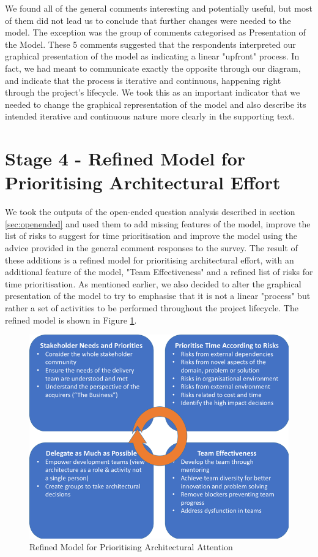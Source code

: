 We found all of the general comments interesting and potentially useful, but most of them did not lead us to conclude that further changes were needed to the model.  The exception was the group of comments categorised as Presentation of the Model.  These 5 comments suggested that the respondents interpreted our graphical presentation of the model as indicating a linear "upfront" process.  In fact, we had meant to communicate exactly the opposite through our diagram, and indicate that the process is iterative and continuous, happening right through the project's lifecycle.  We took this as an important indicator that we needed to change the graphical representation of the model and also describe its intended iterative and continuous nature more clearly in the supporting text.

\section{Stage 4 - Refined Model for Prioritising Architectural Effort}
\label{sec:refined-model}

We took the outputs of the open-ended question analysis described in section \ref{sec:openended} and used them to add missing features of the model, improve the list of risks to suggest for time prioritisation and improve the model using the advice provided in the general comment responses to the survey.
The result of these additions is a refined model for prioritising architectural effort, with an additional feature of the model, "Team Effectiveness" and a refined list of risks for time prioritisation.  As mentioned earlier, we also decided to alter the graphical presentation of the model to try to emphasise that it is not a linear "process" but rather a set of activities to be performed throughout the project lifecycle.  The refined model is shown in Figure \ref{figure:refinedmodel}.

\begin{figure}
\centering
\includegraphics[width=12cm]{Figures/prioritisation-refined-model}
\caption{Refined Model for Prioritising Architectural Attention}
\label{figure:refinedmodel}
\end{figure}


